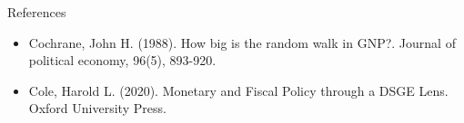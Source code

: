 \documentclass[10pt,c,aspectratio=1610,handout]{beamer}
\begin{document}
\begin{frame}{References}%
  \begin{itemize}%
    \item[$\blacktriangleright$] Cochrane, John H. (1988). How big is the random walk in GNP?. Journal of political economy, 96(5), 893-920.%
    \item[$\blacktriangleright$] Cole, Harold L. (2020). Monetary and Fiscal Policy through a DSGE Lens. Oxford University Press.%
  \end{itemize}%
\end{frame}%
\end{document}
